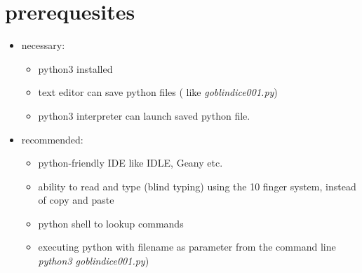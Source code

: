 \documentclass[letterpaper,10pt,english]{sphinxmanual}
\begin{document}
\section{prerequesites}
\label{goblindice001:prerequesites}\begin{itemize}
\item {} 
necessary:
\begin{itemize}
\item {} 
python3 installed

\item {} 
text editor can save python files ( like \emph{goblindice001.py})

\item {} 
python3 interpreter can launch saved python file.

\end{itemize}

\item {} 
recommended:
\begin{itemize}
\item {} 
python-friendly IDE like IDLE, Geany etc.

\item {} 
ability to read and type (blind typing) using the 10 finger system, instead of copy and paste

\item {} 
python shell to lookup commands

\item {} 
executing python with filename as parameter from the command line \emph{python3 goblindice001.py})

\end{itemize}

\end{itemize}
\end{document}
